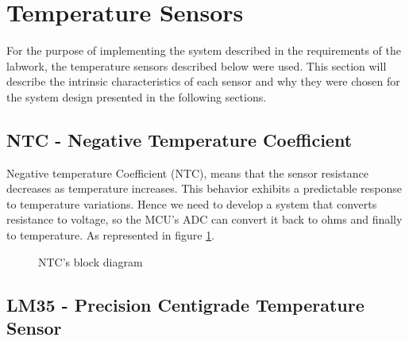 \documentclass[12pt]{article}
\begin{document}
\pagebreak

\section{Temperature Sensors}
For the purpose of implementing the system described in the requirements of the labwork,
the temperature sensors described below were used. This section will describe the intrinsic
characteristics of each sensor and why they were chosen for the system design presented in the
following sections.
\subsection{NTC - Negative Temperature Coefficient}
    
    Negative temperature Coefficient (NTC), means that the sensor resistance decreases as temperature increases. This behavior exhibits a predictable response to temperature variations. Hence we need to develop a system that converts resistance to voltage, so the MCU's ADC can convert it back to ohms and finally to temperature. As represented in figure \ref{fig:NTCBlock}.

    
    \begin{figure}[H]   
    \begin{centering}
        
        \caption{ NTC's block diagram }
        \label{fig:NTCBlock}

    \end{centering}
    \end{figure}

\subsection{LM35 - Precision Centigrade Temperature Sensor}
\end{document}
